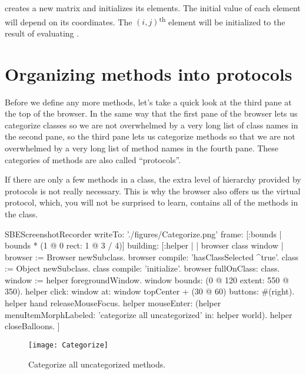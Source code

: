 \documentclass[a4paper,10pt,twoside]{book}
\begin{document}
 creates a new  matrix and initializes its elements.
The initial value of each element will depend on its coordinates.
The {$(i,j)$}\textsuperscript{th} element will be initialized to the result of evaluating .

\section{Organizing methods into protocols}

Before we define any more methods, let's take a quick look at the third pane at the top of the browser.
In the same way that the first pane of the browser lets us categorize classes so we are not overwhelmed by a very long list of class names in the second pane, so the third pane lets us categorize methods so that we are not overwhelmed by a very long list of method names in the fourth pane.
These categories of methods are also called ``protocols''.

If there are only a few methods in a class, the extra level of hierarchy provided by protocols is not really necessary.
This is why the browser also offers us the  virtual protocol, which, you will not be surprised to learn, contains all of the methods in the class.

\begin{ExecuteSmalltalkScript}
SBEScreenshotRecorder writeTo: './figures/Categorize.png' frame: [:bounds | bounds * (1 @ 0 rect: 1 @ 3 / 4)] building: [:helper |
	| browser class window |
  browser := Browser newSubclass.
  browser compile: 'hasClassSelected ^true'.
  class := Object newSubclass.
  class compile: 'initialize'.
  browser fullOnClass: class.
  window := helper foregroundWindow.
  window bounds: (0 @ 120 extent: 550 @ 350).
  helper click: window at: window topCenter + (30 @ 60) buttons: #(right).
  helper hand releaseMouseFocus.
  helper mouseEnter: (helper menuItemMorphLabeled: 'categorize all uncategorized' in: helper world).
  helper closeBalloons.
]
\end{ExecuteSmalltalkScript}
\begin{figure}[htbp]
   \centering
   \texttt{[image: Categorize]}
   \caption{Categorize all uncategorized methods.\label{fig:categorize}}
\end{figure}
\end{document}
